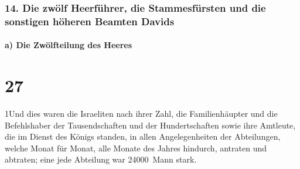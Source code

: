 \hypertarget{die-zwuxf6lf-heerfuxfchrer-die-stammesfuxfcrsten-und-die-sonstigen-huxf6heren-beamten-davids}{%
\subsubsection{14. Die zwölf Heerführer, die Stammesfürsten und die
sonstigen höheren Beamten
Davids}\label{die-zwuxf6lf-heerfuxfchrer-die-stammesfuxfcrsten-und-die-sonstigen-huxf6heren-beamten-davids}}

\hypertarget{a-die-zwuxf6lfteilung-des-heeres}{%
\paragraph{a) Die Zwölfteilung des
Heeres}\label{a-die-zwuxf6lfteilung-des-heeres}}

\hypertarget{section-26}{%
\section{27}\label{section-26}}

1Und dies waren die Israeliten nach ihrer Zahl, die Familienhäupter und
die Befehlshaber der Tausendschaften und der Hundertschaften sowie ihre
Amtleute, die im Dienst des Königs standen, in allen Angelegenheiten der
Abteilungen, welche Monat für Monat, alle Monate des Jahres hindurch,
antraten und abtraten; eine jede Abteilung war 24000~Mann stark.

